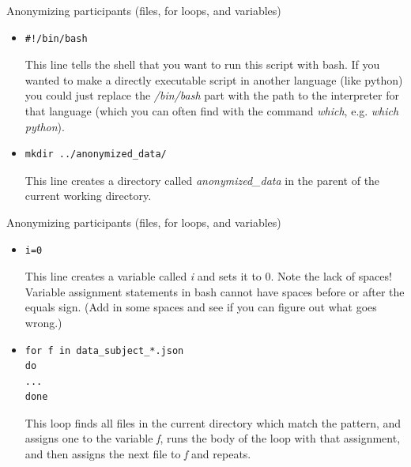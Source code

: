 \documentclass{beamer}
\begin{document}
\begin{frame}[fragile]{Anonymizing participants (files, for loops, and variables)}
\begin{itemize}
\item<1->
\begin{lstlisting}
#!/bin/bash
\end{lstlisting} 
This line tells the shell that you want to run this script with bash. If you wanted to make a directly executable script in another language (like python) you could just replace the \emph{/bin/bash} part with the path to the interpreter for that language (which you can often find with the command \emph{which}, e.g. \emph{which python}).
\item<2->
\begin{lstlisting}
mkdir ../anonymized_data/
\end{lstlisting}
This line creates a directory called \emph{anonymized\_data} in the parent of the current working directory.
\end{itemize}
\end{frame}

\begin{frame}[fragile]{Anonymizing participants (files, for loops, and variables)}
\begin{itemize}
\item<1->
\begin{lstlisting}
i=0
\end{lstlisting} 
This line creates a variable called \emph{i} and sets it to 0. Note the lack of spaces! Variable assignment statements in bash cannot have spaces before or after the equals sign. (Add in some spaces and see if you can figure out what goes wrong.)
\item<2->
\begin{lstlisting}
for f in data_subject_*.json
do
...
done
\end{lstlisting} 
This loop finds all files in the current directory which match the pattern, and assigns one to the variable \emph{f}, runs the body of the loop with that assignment, and then assigns the next file to \emph{f} and repeats. 
\end{itemize}
\end{frame}
\end{document}
